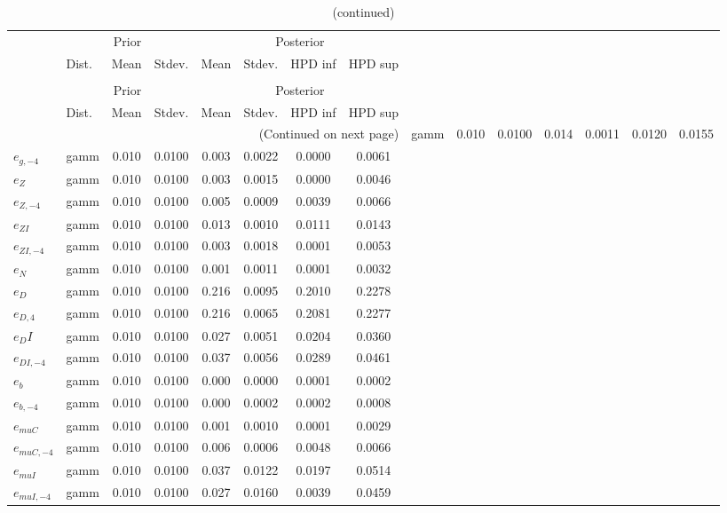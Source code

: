  
\begin{center}
\begin{longtable}{llcccccc} 
\caption{Results from Metropolis-Hastings (standard deviation of structural shocks)}
 \label{Table:MHPosterior:2}\\
\toprule 
  & \multicolumn{3}{c}{Prior}  &  \multicolumn{4}{c}{Posterior} \\
  \cmidrule(r{.75em}){2-4} \cmidrule(r{.75em}){5-8}
  & Dist. & Mean  & Stdev. & Mean & Stdev. & HPD inf & HPD sup\\
\midrule \endfirsthead 
\caption{(continued)}\\\toprule 
  & \multicolumn{3}{c}{Prior}  &  \multicolumn{4}{c}{Posterior} \\
  \cmidrule(r{.75em}){2-4} \cmidrule(r{.75em}){5-8}
  & Dist. & Mean  & Stdev. & Mean & Stdev. & HPD inf & HPD sup\\
\midrule \endhead 
\bottomrule \multicolumn{8}{r}{(Continued on next page)} \endfoot 
\bottomrule \endlastfoot 
${e_g}$ & gamm &   0.010 & 0.0100 &   0.014& 0.0011 &  0.0120 &  0.0155 \\ 
${e_{g,-4}}$ & gamm &   0.010 & 0.0100 &   0.003& 0.0022 &  0.0000 &  0.0061 \\ 
${e_Z}$ & gamm &   0.010 & 0.0100 &   0.003& 0.0015 &  0.0000 &  0.0046 \\ 
${e_{Z,-4}}$ & gamm &   0.010 & 0.0100 &   0.005& 0.0009 &  0.0039 &  0.0066 \\ 
${e_{ZI}}$ & gamm &   0.010 & 0.0100 &   0.013& 0.0010 &  0.0111 &  0.0143 \\ 
${e_{ZI,-4}}$ & gamm &   0.010 & 0.0100 &   0.003& 0.0018 &  0.0001 &  0.0053 \\ 
${e_N}$ & gamm &   0.010 & 0.0100 &   0.001& 0.0011 &  0.0001 &  0.0032 \\ 
${e_D}$ & gamm &   0.010 & 0.0100 &   0.216& 0.0095 &  0.2010 &  0.2278 \\ 
${e_{D,4}}$ & gamm &   0.010 & 0.0100 &   0.216& 0.0065 &  0.2081 &  0.2277 \\ 
${e_DI}$ & gamm &   0.010 & 0.0100 &   0.027& 0.0051 &  0.0204 &  0.0360 \\ 
${e_{DI,-4}}$ & gamm &   0.010 & 0.0100 &   0.037& 0.0056 &  0.0289 &  0.0461 \\ 
${e_b}$ & gamm &   0.010 & 0.0100 &   0.000& 0.0000 &  0.0001 &  0.0002 \\ 
${e_{b,-4}}$ & gamm &   0.010 & 0.0100 &   0.000& 0.0002 &  0.0002 &  0.0008 \\ 
${e_{muC}}$ & gamm &   0.010 & 0.0100 &   0.001& 0.0010 &  0.0001 &  0.0029 \\ 
${e_{muC,-4}}$ & gamm &   0.010 & 0.0100 &   0.006& 0.0006 &  0.0048 &  0.0066 \\ 
${e_{muI}}$ & gamm &   0.010 & 0.0100 &   0.037& 0.0122 &  0.0197 &  0.0514 \\ 
${e_{muI,-4}}$ & gamm &   0.010 & 0.0100 &   0.027& 0.0160 &  0.0039 &  0.0459 \\ 
\end{longtable}
 \end{center}
